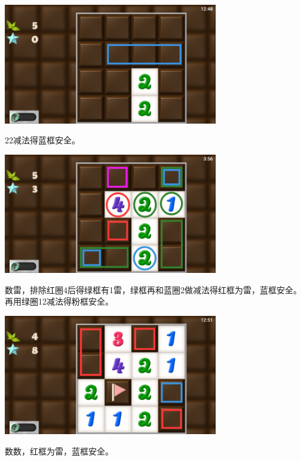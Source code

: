 \subsection{} %
\begin{center}
    \includegraphics[width=0.7\textwidth]{puzzle/136-1.png}
\end{center}
22减法得蓝框安全。
\begin{center}
    \includegraphics[width=0.7\textwidth]{puzzle/136-2.png}
\end{center}
数雷，排除红圈4后得绿框有1雷，绿框再和蓝圈2做减法得红框为雷，蓝框安全。再用绿圈12减法得粉框安全。
\begin{center}
    \includegraphics[width=0.7\textwidth]{puzzle/136-3.png}
\end{center}
数数，红框为雷，蓝框安全。


